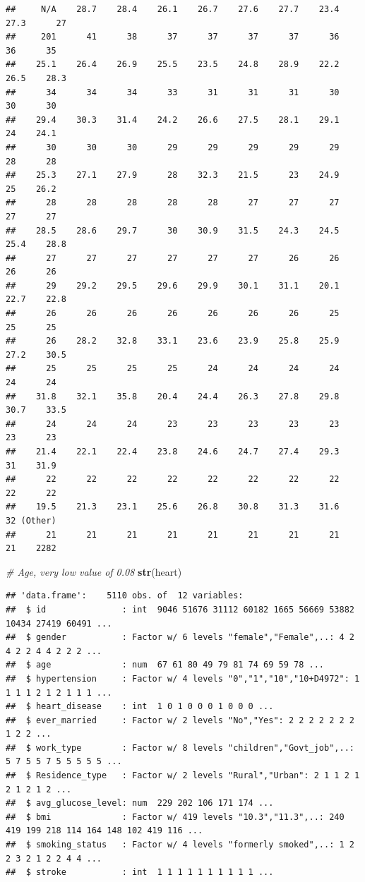 \documentclass[
]{book}
\newenvironment{Shaded}{\begin{snugshade}}{\end{snugshade}}
\newcommand{\CommentTok}[1]{\textcolor[rgb]{0.56,0.35,0.01}{\textit{#1}}}
\newcommand{\FunctionTok}[1]{\textcolor[rgb]{0.13,0.29,0.53}{\textbf{#1}}}
\newcommand{\NormalTok}[1]{#1}
\begin{document}
\begin{verbatim}
##     N/A    28.7    28.4    26.1    26.7    27.6    27.7    23.4    27.3      27 
##     201      41      38      37      37      37      37      36      36      35 
##    25.1    26.4    26.9    25.5    23.5    24.8    28.9    22.2    26.5    28.3 
##      34      34      34      33      31      31      31      30      30      30 
##    29.4    30.3    31.4    24.2    26.6    27.5    28.1    29.1      24    24.1 
##      30      30      30      29      29      29      29      29      28      28 
##    25.3    27.1    27.9      28    32.3    21.5      23    24.9      25    26.2 
##      28      28      28      28      28      27      27      27      27      27 
##    28.5    28.6    29.7      30    30.9    31.5    24.3    24.5    25.4    28.8 
##      27      27      27      27      27      27      26      26      26      26 
##      29    29.2    29.5    29.6    29.9    30.1    31.1    20.1    22.7    22.8 
##      26      26      26      26      26      26      26      25      25      25 
##      26    28.2    32.8    33.1    23.6    23.9    25.8    25.9    27.2    30.5 
##      25      25      25      25      24      24      24      24      24      24 
##    31.8    32.1    35.8    20.4    24.4    26.3    27.8    29.8    30.7    33.5 
##      24      24      24      23      23      23      23      23      23      23 
##    21.4    22.1    22.4    23.8    24.6    24.7    27.4    29.3      31    31.9 
##      22      22      22      22      22      22      22      22      22      22 
##    19.5    21.3    23.1    25.6    26.8    30.8    31.3    31.6      32 (Other) 
##      21      21      21      21      21      21      21      21      21    2282
\end{verbatim}

\begin{Shaded}
\begin{Highlighting}[]
\CommentTok{\# Age, very low value of 0.08}
\FunctionTok{str}\NormalTok{(heart) }
\end{Highlighting}
\end{Shaded}

\begin{verbatim}
## 'data.frame':    5110 obs. of  12 variables:
##  $ id               : int  9046 51676 31112 60182 1665 56669 53882 10434 27419 60491 ...
##  $ gender           : Factor w/ 6 levels "female","Female",..: 4 2 4 2 2 4 4 2 2 2 ...
##  $ age              : num  67 61 80 49 79 81 74 69 59 78 ...
##  $ hypertension     : Factor w/ 4 levels "0","1","10","10+D4972": 1 1 1 1 2 1 2 1 1 1 ...
##  $ heart_disease    : int  1 0 1 0 0 0 1 0 0 0 ...
##  $ ever_married     : Factor w/ 2 levels "No","Yes": 2 2 2 2 2 2 2 1 2 2 ...
##  $ work_type        : Factor w/ 8 levels "children","Govt_job",..: 5 7 5 5 7 5 5 5 5 5 ...
##  $ Residence_type   : Factor w/ 2 levels "Rural","Urban": 2 1 1 2 1 2 1 2 1 2 ...
##  $ avg_glucose_level: num  229 202 106 171 174 ...
##  $ bmi              : Factor w/ 419 levels "10.3","11.3",..: 240 419 199 218 114 164 148 102 419 116 ...
##  $ smoking_status   : Factor w/ 4 levels "formerly smoked",..: 1 2 2 3 2 1 2 2 4 4 ...
##  $ stroke           : int  1 1 1 1 1 1 1 1 1 1 ...
\end{verbatim}
\end{document}
